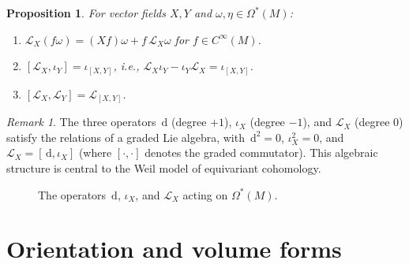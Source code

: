 \documentclass[12pt,a4paper,openany]{book}
\newtheorem{proposition}[theorem]{Proposition}
\theoremstyle{definition}
\theoremstyle{remark}
\newtheorem{remark}[theorem]{Remark}
\newcommand{\dd}{\,\mathrm{d}}
\begin{document}
\begin{proposition}\label{prop:lie-derivative-properties}
For vector fields $X, Y$ and $\omega, \eta \in \Omega^*(M)$:
\begin{enumerate}[label=(\roman*)]
  \item $\mathcal{L}_X(f\omega) = (Xf)\omega + f\,\mathcal{L}_X\omega$
    for $f \in C^\infty(M)$.
  \item $[\mathcal{L}_X, \iota_Y] = \iota_{[X,Y]}$, i.e.,
    $\mathcal{L}_X \iota_Y - \iota_Y \mathcal{L}_X = \iota_{[X,Y]}$.
  \item $[\mathcal{L}_X, \mathcal{L}_Y] = \mathcal{L}_{[X,Y]}$.
\end{enumerate}
\end{proposition}

\begin{remark}\label{rem:graded-algebra-operators}
The three operators $\dd$ (degree $+1$), $\iota_X$ (degree $-1$), and
$\mathcal{L}_X$ (degree $0$) satisfy the relations of a graded Lie algebra,
with $\dd^2 = 0$, $\iota_X^2 = 0$, and
$\mathcal{L}_X = [\dd, \iota_X]$ (where $[\cdot,\cdot]$ denotes the graded
commutator). This algebraic structure is central to the Weil model of
equivariant cohomology.
\end{remark}

\begin{figure}[ht]
\centering
{}
\caption{The operators $\dd$, $\iota_X$, and $\mathcal{L}_X$ acting on $\Omega^*(M)$.}
\label{fig:operators-forms}
\end{figure}

\section{Orientation and volume forms}\label{sec:orientation}
\end{document}
